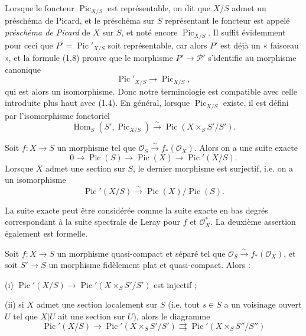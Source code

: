 Lorsque le foncteur $\operatorname{Pic}_{X/S}$ est représentable, on dit que
$X/S$ admet un préschéma de Picard, et le préschéma sur $S$ représentant le
foncteur est appelé \emph{préschéma de Picard} de $X$ sur $S$, et noté encore
$\operatorname{Pic}_{X/S}$. Il suffit évidemment pour ceci que
$P'=\operatorname{Pic}'_{X/S}$ soit représentable, car alors $P'$ est déjà un
« faisceau », et la formule (1.8) prouve que le morphisme
$P'\longrightarrow\mathcal P'$ s'identifie au morphisme canonique
\begin{equation}
\operatorname{Pic}'_{X/S}\longrightarrow\operatorname{Pic}_{X/S},
\tag{1.9}
\end{equation}
qui est alors un isomorphisme. Donc notre terminologie est compatible avec
celle introduite plus haut avec (1.4). En général, lorsque
$\operatorname{Pic}_{X/S}$ existe, il est défini par l'isomorphisme fonctoriel
\begin{equation}
\operatorname{Hom}_S(S',\operatorname{Pic}_{X/S})\xrightarrow{\sim}
\operatorname{Pic}(X\times_SS'/S').
\tag{1.10}
\end{equation}


 Soit $f:X\longrightarrow S$ un morphisme tel que
$\mathcal O_S\xrightarrow{\sim}f_*(\mathcal O_X)$. Alors on a une suite exacte
\[
0\longrightarrow\operatorname{Pic}(S)\longrightarrow\operatorname{Pic}(X)
\longrightarrow\operatorname{Pic}'(X/S).
\]
Lorsque $X$ admet une section sur $S$, le dernier morphisme est surjectif, i.e.
on a un isomorphisme
\[
\operatorname{Pic}'(X/S)\xrightarrow{\sim}
\operatorname{Pic}(X)/\operatorname{Pic}(S).
\]

La suite exacte peut être considérée comme la suite exacte en bas degrés
correspondant à la suite spectrale de Leray pour $f$ et $\mathcal O_X^*$. La
deuxième assertion également est formelle.

 Soit $f:X\longrightarrow S$ un morphisme
quasi-compact et séparé tel que
$\mathcal O_S\xrightarrow{\sim}f_*(\mathcal O_X)$, et soit
$S'\longrightarrow S$ un morphisme fidèlement plat et quasi-compact. Alors :

\noindent (i) $\operatorname{Pic}'(X/S)\longrightarrow
\operatorname{Pic}'(X\times_SS'/S')$ est injectif ;

\noindent (ii) si $X$ admet une section localement sur $S$ (i.e. tout $s\in S$
a un voisinage ouvert $U$ tel que $X|U$ ait une section sur $U$), alors le
diagramme
\[
\operatorname{Pic}'(X/S)\longrightarrow
\operatorname{Pic}'(X\times_SS'/S')\rightrightarrows
\operatorname{Pic}'(X\times_SS''/S'')
\]

